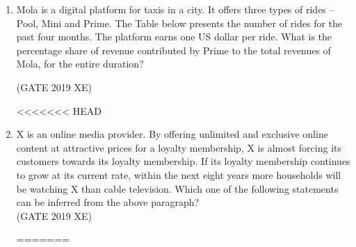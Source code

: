 \documentclass[journal,12pt,onecolumn]{IEEEtran}
\begin{document}
\begin{enumerate}
\item Mola is a digital platform for taxis in a city. It offers three types of rides -- Pool, Mini and Prime. The Table below presents the number of rides for the past four months. The platform earns one US dollar per ride. What is the percentage share of revenue contributed by Prime to the total revenues of Mola, for the entire duration?




\hfill{(GATE 2019 XE)} 
\begin{multicols}{2}
<<<<<<< HEAD
\end{multicols}

\item X is an online media provider. By offering unlimited and exclusive online content at attractive prices for a loyalty membership, X is almost forcing its customers towards its loyalty membership. If its loyalty membership continues to grow at its current rate, within the next eight years more households will be watching X than cable television. Which one of the following statements can be inferred from the above paragraph?\\
\hfill{(GATE 2019 XE)} 
\begin{multicols}{2}
\begin{enumerate}
=======


\end{enumerate}
\end{multicols}
\end{enumerate}
\end{document}
